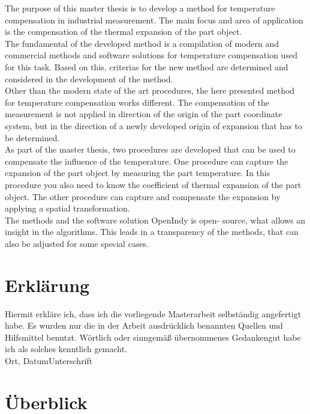 The purpose of this master thesis is to develop a method for temperature compensation in industrial measurement. The main focus and area of application is the compensation of the thermal expansion of the part object.\\
The fundamental of the developed method is a compilation of modern and commercial methods and software solutions for temperature compensation used for this task. Based on this, criterias for the new method are determined and considered in the development of the method.\\
Other than the modern state of the art procedures, the here presented method for temperature compensation works different. The compensation of the measurement is not applied in direction of the origin of the part coordinate system, but in the direction of a newly developed origin of expansion that has to be determined.\\
As part of the master thesis, two procedures are developed that can be used to compensate the influence of the temperature. One procedure can capture the expansion of the part object by measuring the part temperature. In this procedure you also need to know the coefficient of thermal expansion of the part object. The other procedure can capture and compensate the expansion by applying a spatial transformation.\\
The methods and the software solution OpenIndy is open- source, what allows an insight in the algorithms. This leads in a transparency of the methods, that can also be adjusted for some special cases.


\chapter*{Erklärung}
Hiermit erkläre ich, dass ich die vorliegende Masterarbeit selbständig angefertigt habe. Es wurden nur die in der Arbeit ausdrücklich benannten Quellen und Hilfsmittel benutzt. Wörtlich oder sinngemäß übernommenes Gedankengut habe ich als solches kenntlich gemacht.\\

\vspace{3cm}
Ort, Datum\hrulefill \enspace Unterschrift\hrulefill\\

\tableofcontents
\listoffigures
\listoftables

\chapter{Überblick}\label{chap:Überblick}


